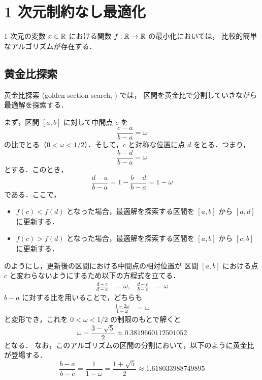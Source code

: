 %

\chapter{1 次元制約なし最適化}\label{chap:opt_one-dim-section-search}

1 次元の変数 $x \in \mathbb{R}$ における関数 $f : \mathbb{R} \to \mathbb{R}$ の最小化においては，
比較的簡単なアルゴリズムが存在する．

\section{黄金比探索}\label{sec:optimization_golden-section-search}

黄金比探索 (golden section search, \cite[10.2]{Press2007}) では，
区間を黄金比で分割していきながら最適解を探索する．

まず，区間 $[a,b]$ に対して中間点 $c$ を
\begin{equation}
    \frac{c - a}{b - a} = \omega
\end{equation}
の比でとる（$0 < \omega < 1/2$）．そして，$c$ と対称な位置に点 $d$ をとる．つまり，
\begin{equation}
    \frac{b - d}{b - a} = \omega
\end{equation}
とする．このとき，
\begin{equation}
    \frac{d - a}{b - a} = 1 - \frac{b - d}{b - a} = 1 - \omega
\end{equation}
である．ここで，
\begin{itemize}
    \item $f(c) < f(d)$ となった場合，最適解を探索する区間を $[a, b]$ から $[a, d]$ に更新する．
    \item $f(c) > f(d)$ となった場合，最適解を探索する区間を $[a, b]$ から $[c, b]$ に更新する．
\end{itemize}
のようにし，更新後の区間における中間点の相対位置が
区間 $[a, b]$ における点 $c$ と変わらないようにするため以下の方程式を立てる．
\begin{align}
    \frac{d - c}{d - a} & = \omega, &
    \frac{d - c}{b - c} & = \omega
\end{align}
$b - a$ に対する比を用いることで，どちらも
\begin{align}
    \frac{1 - 2\omega}{1 - \omega} & = \omega
\end{align}
と変形でき，これを $0 < \omega < 1/2$ の制限のもとで解くと
\begin{equation}
    \omega = \frac{3 - \sqrt{5}}{2} \approx 0.3819660112501052
\end{equation}
となる．
なお，このアルゴリズムの区間の分割において，以下のように黄金比が登場する．
\begin{equation}
    \frac{b - a}{b - c} = \frac{1}{1 - \omega} = \frac{1 + \sqrt{5}}{2} \approx 1.618033988749895
\end{equation}
